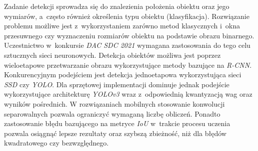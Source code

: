 Zadanie detekcji sprowadza się do znalezienia położenia obiektu oraz jego wymiarów, a~często również określenia typu obiektu (klasyfikacja). 
Rozwiązanie problemu możliwe jest z~wykorzystaniem zarówno metod klasycznych i~okna przesuwnego czy wyznaczeniu rozmiarów obiektu na podstawie obrazu binarnego.
Uczestnictwo w~konkursie \emph{DAC SDC 2021} wymagana zastosowania do tego celu sztucznych sieci neuronowych.
Detekcja obiektów możliwa jest poprzez wieloetapowe przetwarzanie obrazu wykorzystujące metody bazujące na \emph{R-CNN}. 
Konkurencyjnym podejściem jest detekcja jednoetapowa wykorzystująca sieci \emph{SSD} czy \emph{YOLO}.
Dla sprzętowej implementacji dominuje jednak podejście wykorzystujące architekturę \emph{YOLOv3} wraz z~odpowiednią kwantyzacją wag oraz wyników pośrednich.
W rozwiązaniach mobilnych stosowanie konwolucji separowalnych pozwala ograniczyć wymaganą liczbę obliczeń.
Ponadto zastosowanie błędu bazującego na metryce \emph{IoU} w~trakcie procesu uczenia pozwala osiągnąć lepsze rezultaty oraz szybszą zbieżność, niż dla błędów kwadratowego czy bezwzględnego.





